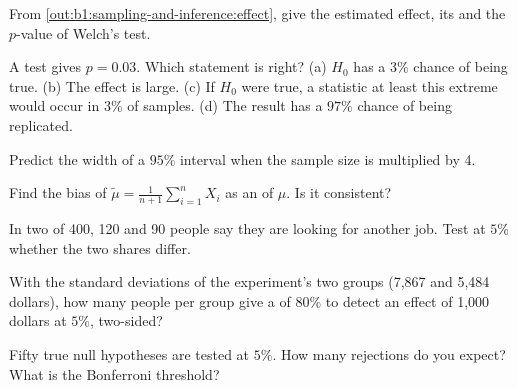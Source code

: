 \begin{exercise}[$\star$]\label{exo:b1:sampling-and-inference:read}
From \cref{out:b1:sampling-and-inference:effect}, give the estimated effect, its 
and the $p$-value of Welch's test.
\end{exercise}

\begin{exercise}[$\star$]\label{exo:b1:sampling-and-inference:statements}
A test gives $p = 0.03$. Which statement is right? (a) $H_0$ has a $3\%$ chance of
being true. (b) The effect is large. (c) If $H_0$ were true, a statistic at least
this extreme would occur in $3\%$ of samples. (d) The result has a $97\%$ chance of
being replicated.
\end{exercise}

\begin{exercise}[$\star$]\label{exo:b1:sampling-and-inference:width}
Predict the width of a $95\%$ interval when the sample size is multiplied by 4.
\end{exercise}

\begin{exercise}[$\star\star$]\label{exo:b1:sampling-and-inference:bias}
Find the bias of $\tilde\mu = \frac1{n+1}\sum_{i=1}^n X_i$ as an  of $\mu$. Is it consistent?
\end{exercise}

\begin{exercise}[$\star\star$]\label{exo:b1:sampling-and-inference:proportions}
In two  of 400, 120 and 90 people say they are looking for
another job. Test at $5\%$ whether the two  shares differ.
\end{exercise}

\begin{exercise}[$\star\star$]\label{exo:b1:sampling-and-inference:size}
With the standard deviations of the experiment's two groups (7,867 and 5,484
dollars), how many people per group give a  of $80\%$ to detect an effect
of 1,000 dollars at $5\%$, two-sided?
\end{exercise}

\begin{exercise}[$\star\star$]\label{exo:b1:sampling-and-inference:fifty}
Fifty true null hypotheses are tested at $5\%$. How many rejections do you
expect? What is the Bonferroni threshold?
\end{exercise}

